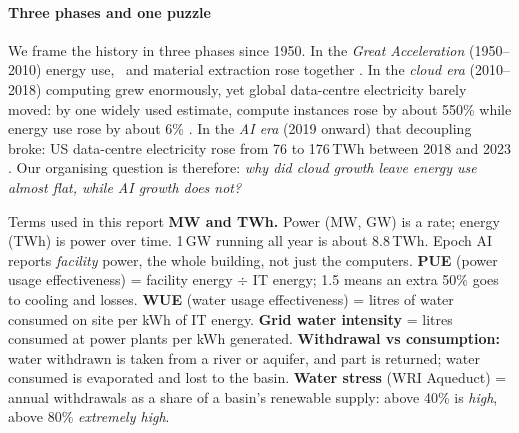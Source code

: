 \paragraph{Three phases and one puzzle} We frame the history in three phases since 1950. In the \emph{Great
Acceleration} (1950--2010) energy use, \cotwo\ and material extraction rose together \citep{steffen2015ga}. In the
\emph{cloud era} (2010--2018) computing grew enormously, yet global data-centre electricity barely moved: by one widely
used estimate, compute instances rose by about 550\% while energy use rose by about 6\% \citep{masanet2020}. In the
\emph{AI era} (2019 onward) that decoupling broke: US data-centre electricity rose from 76 to 176\,TWh between 2018
and 2023 \citep{shehabi2024}. Our organising question is therefore: \emph{why did cloud growth leave energy use almost
flat, while AI growth does not?}

\begin{finding}{Terms used in this report}
\textbf{MW and TWh.} Power (MW, GW) is a rate; energy (TWh) is power over time. 1\,GW running all year is about
8.8\,TWh. Epoch AI reports \emph{facility} power, the whole building, not just the computers.
\textbf{PUE} (power usage effectiveness) = facility energy $\div$ IT energy; 1.5 means an extra 50\% goes to cooling
and losses. \textbf{WUE} (water usage effectiveness) = litres of water consumed on site per kWh of IT energy.
\textbf{Grid water intensity} = litres consumed at power plants per kWh generated. \textbf{Withdrawal vs
consumption:} water withdrawn is taken from a river or aquifer, and part is returned; water consumed is evaporated and
lost to the basin. \textbf{Water stress} (WRI Aqueduct) = annual withdrawals as a share of a basin's renewable supply:
above 40\% is \emph{high}, above 80\% \emph{extremely high}.
\end{finding}
